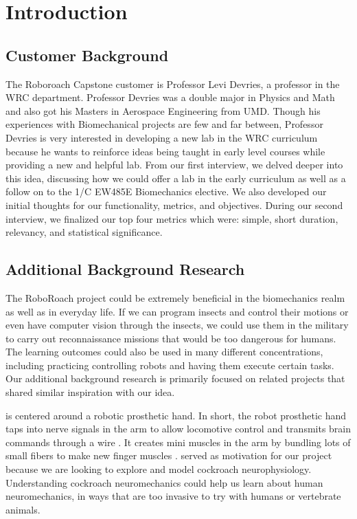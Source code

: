 \documentclass{article}
\begin{document}
\section{Introduction}
\subsection{Customer Background}
\par The Roboroach Capstone customer is Professor Levi Devries, a professor in the WRC department. Professor Devries was a double major in Physics and Math and also got his Masters in Aerospace Engineering from UMD. Though his experiences with Biomechanical projects are few and far between, Professor Devries is very interested in developing a new lab in the WRC curriculum because he wants to reinforce ideas being taught in early level courses while providing a new and helpful lab. From our first interview, we delved deeper into this idea, discussing how we could offer a lab in the early curriculum as well as a follow on to the 1/C EW485E Biomechanics elective. We also developed our initial thoughts for our functionality, metrics, and objectives. During our second interview, we finalized our top four metrics which were: simple, short duration, relevancy, and statistical significance. 

\subsection{Additional Background Research}

\par The RoboRoach project could be extremely beneficial in the biomechanics realm as well as in everyday life. If we can program insects and control their motions or even have computer vision through the insects, we could use them in the military to carry out reconnaissance missions that would be too dangerous for humans. The learning outcomes could also be used in many different concentrations, including practicing controlling robots and having them execute certain tasks. Our additional background research is primarily focused on related projects that shared similar inspiration with our idea. 

\bigskip

\cite{servick2020minimuscles} is centered around a robotic prosthetic hand. 
In short, the robot prosthetic hand taps into nerve signals in the arm to allow locomotive control and transmits brain commands through a wire \cite{servick2020minimuscles}. It creates mini muscles in the arm by bundling lots of small fibers to make new finger muscles \cite{servick2020minimuscles}. \cite{servick2020minimuscles} served as motivation for our project because we are looking to explore and model cockroach neurophysiology. Understanding cockroach neuromechanics could help us learn about human neuromechanics, in ways that are too invasive to try with humans or vertebrate animals. 
\end{document}
